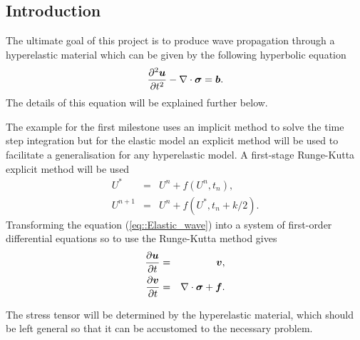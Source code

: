 \subsection{Introduction}
The ultimate goal of this project is to produce wave propagation through a hyperelastic material which can be given by the following hyperbolic equation
\begin{equation}
  \label{eq::Elastic_wave}
  \frac{\partial^2 \bm{u}}{\partial t^2} - \nabla\cdot \bm{\sigma} = \bm{b}.
\end{equation}
The details of this equation will be explained further below.

The example for the first milestone uses an implicit method to solve the time step integration but for the elastic model an explicit method will be used to facilitate a generalisation for any hyperelastic model. A first-stage Runge-Kutta explicit method will be used
\begin{eqnarray*}
  U^* & = & U^n + f(U^n,t_n), \\
  U^{n+1} & = & U^n + f(U^*,t_n+k/2).
\end{eqnarray*}
Transforming the equation (\ref{eq::Elastic_wave}) into a system of first-order differential equations so to use the Runge-Kutta method gives
\begin{eqnarray*}
  \frac{\partial \bm{u}}{\partial t} & = & \bm{v}, \\
  \frac{\partial \bm{v}}{\partial t} & = & \nabla\cdot\bm{\sigma} + \bm{f}.
\end{eqnarray*}

The stress tensor will be determined by the hyperelastic material, which should be left general so that it can be accustomed to the necessary problem. 
